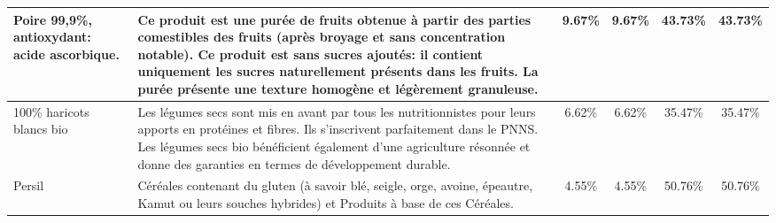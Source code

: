 \begin{tabular}{p{5cm}p{5cm}cccc}
                                                                                                                                                                                                                                              Poire 99,9\%, antioxydant: acide ascorbique. &  Ce produit est une purée de fruits obtenue à partir des parties comestibles des fruits (après broyage et sans  \newline concentration notable). \newline Ce produit est sans sucres ajoutés: il contient uniquement les sucres naturellement présents dans les fruits. \newline La purée présente une texture homogène et légèrement granuleuse. &   9.67\% &   9.67\% &  43.73\% &   43.73\% \\ \hline
                                                                                                                                                                                                                                                                 100\% haricots blancs bio &                              Les légumes secs sont mis en avant par tous les nutritionnistes pour leurs apports en protéines et fibres. Ils s’inscrivent parfaitement  \newline dans le PNNS.  \newline Les légumes secs bio bénéficient également d’une agriculture résonnée et donne des garanties en termes de développement durable.  &   6.62\% &   6.62\% &  35.47\% &   35.47\% \\ \hline
                                                                                                                                                                                                                                                                                   Persil &                                                                                                                                                                         Céréales contenant du gluten (à savoir blé, seigle, orge, avoine, épeautre, Kamut ou leurs souches hybrides) \newline et Produits à base de ces Céréales. &   4.55\% &   4.55\% &  50.76\% &   50.76\% \\ \hline
\bottomrule
\end{tabular}
